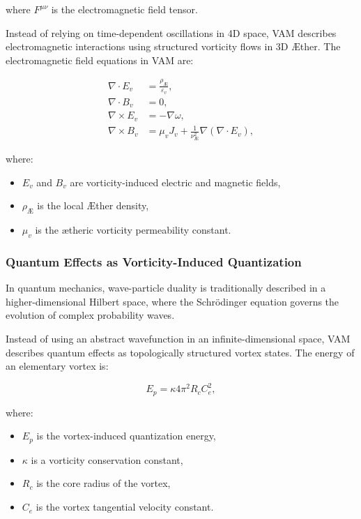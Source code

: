     where \( F^{\mu\nu} \) is the electromagnetic field tensor.

    Instead of relying on time-dependent oscillations in 4D space, VAM describes electromagnetic interactions using structured vorticity flows in 3D Æther. The electromagnetic field equations in VAM are:

    \begin{align}
        \nabla \cdot E_v &= \frac{\rho_\text{Æ}}{\varepsilon_v}, \\
        \nabla \cdot B_v &= 0, \\
        \nabla \times E_v &= -\nabla \omega, \\
        \nabla \times B_v &= \mu_v J_v + \frac{1}{\nu^2_\text{Æ}} \nabla(\nabla \cdot E_v),
    \end{align}

    where:
    \begin{itemize}
        \item \( E_v \) and \( B_v \) are vorticity-induced electric and magnetic fields,
        \item \( \rho_\text{Æ} \) is the local Æther density,
        \item \( \mu_v \) is the ætheric vorticity permeability constant.
    \end{itemize}

    \subsubsection*{Quantum Effects as Vorticity-Induced Quantization}

    In quantum mechanics, wave-particle duality is traditionally described in a higher-dimensional Hilbert space, where the Schrödinger equation governs the evolution of complex probability waves.

    Instead of using an abstract wavefunction in an infinite-dimensional space, VAM describes quantum effects as topologically structured vortex states. The energy of an elementary vortex is:

    \begin{equation*}
        E_p = \kappa 4\pi^2 R_c C^2_e,
    \end{equation*}

    where:
    \begin{itemize}
        \item \( E_p \) is the vortex-induced quantization energy,
        \item \( \kappa \) is a vorticity conservation constant,
        \item \( R_c \) is the core radius of the vortex,
        \item \( C_e \) is the vortex tangential velocity constant.
    \end{itemize}

